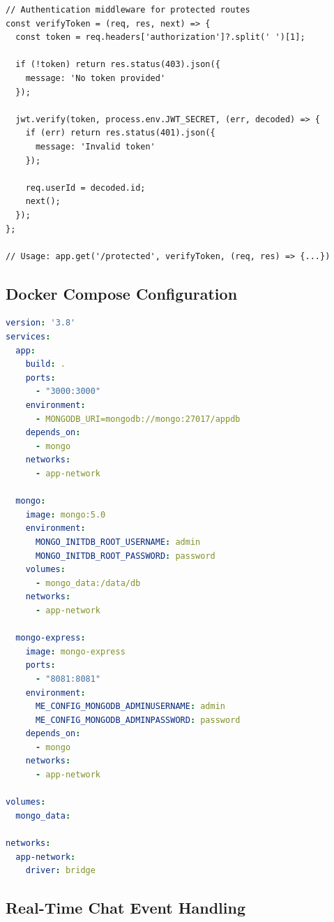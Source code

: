 \begin{lstlisting}[basicstyle=\ttfamily\small, caption=Express JWT Middleware, captionpos=b]
// Authentication middleware for protected routes
const verifyToken = (req, res, next) => {
  const token = req.headers['authorization']?.split(' ')[1];
  
  if (!token) return res.status(403).json({ 
    message: 'No token provided' 
  });
  
  jwt.verify(token, process.env.JWT_SECRET, (err, decoded) => {
    if (err) return res.status(401).json({ 
      message: 'Invalid token' 
    });
    
    req.userId = decoded.id;
    next();
  });
};

// Usage: app.get('/protected', verifyToken, (req, res) => {...})
\end{lstlisting}

\subsection{Docker Compose Configuration}

\begin{lstlisting}[language=yaml, caption=Multi-Container Docker Setup, captionpos=b]
version: '3.8'
services:
  app:
    build: .
    ports:
      - "3000:3000"
    environment:
      - MONGODB_URI=mongodb://mongo:27017/appdb
    depends_on:
      - mongo
    networks:
      - app-network
  
  mongo:
    image: mongo:5.0
    environment:
      MONGO_INITDB_ROOT_USERNAME: admin
      MONGO_INITDB_ROOT_PASSWORD: password
    volumes:
      - mongo_data:/data/db
    networks:
      - app-network
  
  mongo-express:
    image: mongo-express
    ports:
      - "8081:8081"
    environment:
      ME_CONFIG_MONGODB_ADMINUSERNAME: admin
      ME_CONFIG_MONGODB_ADMINPASSWORD: password
    depends_on:
      - mongo
    networks:
      - app-network

volumes:
  mongo_data:

networks:
  app-network:
    driver: bridge
\end{lstlisting}

\subsection{Real-Time Chat Event Handling}

